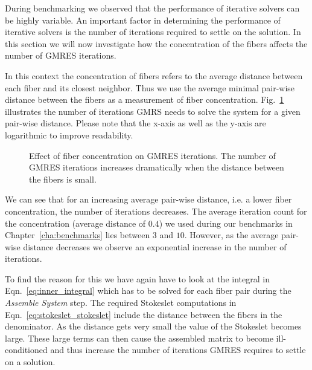 During benchmarking we observed that the performance of iterative solvers can be highly variable. An important factor in determining the performance of iterative solvers is the number of iterations required to settle on the solution. In this section we will now investigate how the concentration of the fibers affects the number of GMRES iterations. 

In this context the concentration of fibers refers to the average distance between each fiber and its closest neighbor. Thus we use the average minimal pair-wise distance between the fibers as a measurement of fiber concentration. Fig.~\ref{fig:concentration_gmres} illustrates the number of iterations GMRS needs to solve the system for a given pair-wise distance. Please note that the x-axis as well as the y-axis are logarithmic to improve readability.

\begin{figure}[!htbp]
  \centering
  \caption[Effect of fiber concentration on GMRES iterations.]{Effect of fiber concentration on GMRES iterations. The number of GMRES iterations increases dramatically when the distance between the fibers is small.}
  \label{fig:concentration_gmres}
\end{figure}

We can see that for an increasing average pair-wise distance, i.e. a lower fiber concentration, the number of iterations decreases. The average iteration count for the concentration (average distance of $0.4$) we used during our benchmarks in Chapter~\ref{cha:benchmarks} lies between $3$ and $10$. However, as the average pair-wise distance decreases we observe an exponential increase in the number of iterations.

To find the reason for this we have again have to look at the integral in Eqn.~\eqref{eq:inner_integral} which has to be solved for each fiber pair during the \emph{Assemble System} step. The required Stokeslet computations in Eqn.~\eqref{eq:stokeslet_stokeslet} include the distance between the fibers in the denominator. As the distance gets very small the value of the Stokeslet becomes large. These large terms can then cause the assembled matrix to become ill-conditioned and thus increase the number of iterations GMRES requires to settle on a solution.

